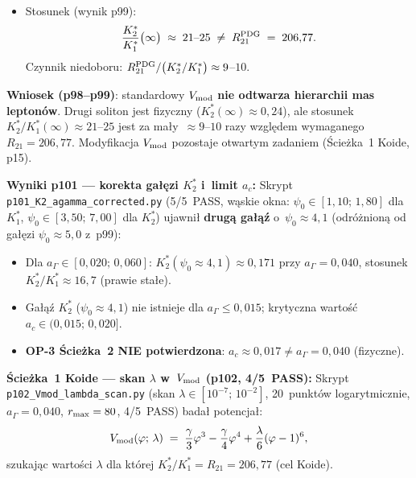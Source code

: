 \begin{remark}
\begin{itemize}[nosep]
  \item Stosunek (wynik p99):
    \begin{equation}\label{eq:K2K1-p99}
      \frac{K^*_2}{K^*_1}\bigl(\infty\bigr)
        \;\approx\; 21\text{--}25
        \;\neq\; R_{21}^{\rm PDG} \;=\; 206{,}77.
    \end{equation}
    Czynnik niedoboru: $R_{21}^{\rm PDG}/\bigl(K^*_2/K^*_1\bigr) \approx 9$--$10$.
\end{itemize}
\textbf{Wniosek (p98--p99)}: standardowy $V_{\rm mod}$ \textbf{nie odtwarza hierarchii mas
lepton\'ow}. Drugi soliton jest fizyczny ($K^*_2(\infty)\approx 0{,}24$),
ale stosunek $K^*_2/K^*_1(\infty)\approx21$--$25$ jest
za ma\l{}y~$\approx9$--$10$ razy wzgl\k{e}dem wymaganego $R_{21}=206{,}77$.
Modyfikacja $V_{\rm mod}$ pozostaje otwartym zadaniem (\'Scie\.zka~1 Koide, p15).

\medskip
\textbf{Wyniki p101 --- korekta ga\l{}\k{e}zi $K^*_2$ i~limit $a_c$:}
Skrypt \texttt{p101\_K2\_agamma\_corrected.py} (5/5~PASS,
w\k{a}skie okna: $\psi_0 \in [1{,}10;\,1{,}80]$ dla $K^*_1$,
$\psi_0 \in [3{,}50;\,7{,}00]$ dla $K^*_2$)
ujawni\l{} \textbf{drug\k{a} ga\l{}\k{a}\'z} o~$\psi_0 \approx 4{,}1$
(odr\'o\.znion\k{a} od ga\l{}\k{e}zi $\psi_0 \approx 5{,}0$ z~p99):
\begin{itemize}[nosep]
  \item Dla $a_\Gamma \in [0{,}020;\,0{,}060]$:
    $K^*_2(\psi_0{\approx}4{,}1) \approx 0{,}171$ przy $a_\Gamma = 0{,}040$,
    stosunek $K^*_2/K^*_1 \approx 16{,}7$ (prawie sta\l{}e).
  \item Ga\l{}\k{a}\'z $K^*_2$ (\textbf{$\psi_0 \approx 4{,}1$}) nie istnieje
    dla $a_\Gamma \leq 0{,}015$; krytyczna warto\'s\'c $a_c \in (0{,}015;\,0{,}020]$.
  \item \textbf{OP-3 \'Scie\.zka~2 NIE potwierdzona}:
    $a_c \approx 0{,}017 \neq a_\Gamma = 0{,}040$ (fizyczne).
\end{itemize}

\medskip
\textbf{\'Scie\.zka~1 Koide --- skan $\lambda$ w~$V_{\rm mod}$ (p102, 4/5~PASS):}%
\label{para:p102-lambda-scan}
Skrypt \texttt{p102\_Vmod\_lambda\_scan.py}
(skan $\lambda \in [10^{-7};\,10^{-2}]$, 20~punkt\'ow logarytmicznie,
$a_\Gamma = 0{,}040$, $r_{\rm max}=80$, 4/5~PASS)
bada\l{} potencja\l{}:
\begin{equation}\label{eq:Vmod-lambda}
  V_{\rm mod}(\varphi;\,\lambda)
  \;=\; \frac{\gamma}{3}\varphi^3 - \frac{\gamma}{4}\varphi^4
       + \frac{\lambda}{6}(\varphi-1)^6,
\end{equation}
szukaj\k{a}c warto\'sci $\lambda$ dla kt\'orej
$K^*_2/K^*_1 = R_{21} = 206{,}77$ (cel Koide).


\end{remark}
